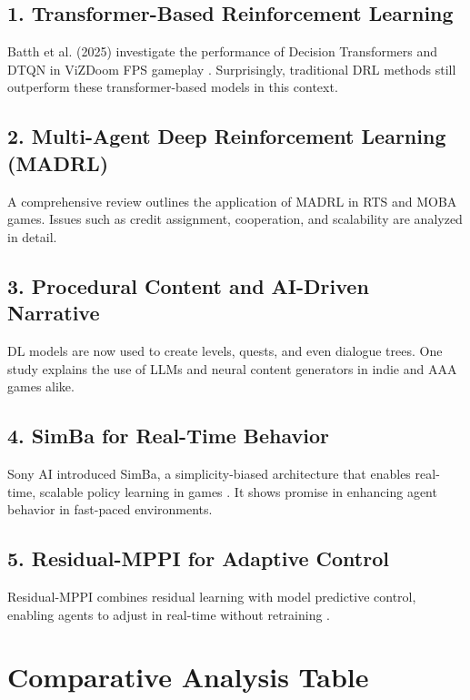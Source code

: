 \documentclass[12pt]{article}
\begin{document}
\subsection{1. Transformer-Based Reinforcement Learning}
Batth et al. (2025) investigate the performance of Decision Transformers and DTQN in ViZDoom FPS gameplay \cite{batth2025fps}. Surprisingly, traditional DRL methods still outperform these transformer-based models in this context.

\subsection{2. Multi-Agent Deep Reinforcement Learning (MADRL)}
A comprehensive review \cite{madrl2025review} outlines the application of MADRL in RTS and MOBA games. Issues such as credit assignment, cooperation, and scalability are analyzed in detail.

\subsection{3. Procedural Content and AI-Driven Narrative}
DL models are now used to create levels, quests, and even dialogue trees. One study \cite{gameai2025} explains the use of LLMs and neural content generators in indie and AAA games alike.

\subsection{4. SimBa for Real-Time Behavior}
Sony AI introduced SimBa, a simplicity-biased architecture that enables real-time, scalable policy learning in games \cite{simba2025}. It shows promise in enhancing agent behavior in fast-paced environments.

\subsection{5. Residual-MPPI for Adaptive Control}
Residual-MPPI combines residual learning with model predictive control, enabling agents to adjust in real-time without retraining \cite{residualmppi2025}.

\section{Comparative Analysis Table}
\end{document}

